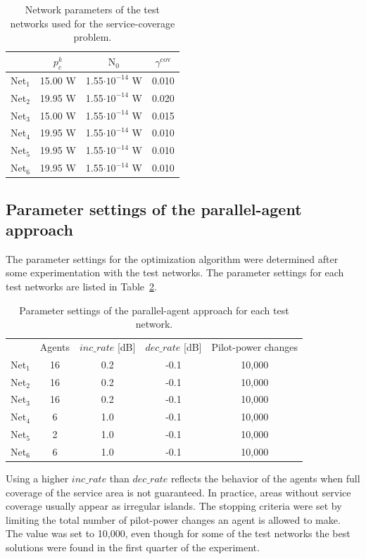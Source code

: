 \begin{table}
\caption{Network parameters of the test networks used for the service-coverage
problem.\emph{\label{tab:06-Test_network_parameters}}}


\centering

\begin{tabular}{cccc}
\cline{2-4} 
 & $p_{c}^{k}$ & $\mathrm{N}_{0}$ & $\gamma^{\mathrm{cov}}$\tabularnewline
\hline 
Net$_{1}$ & 15.00 W & 1.55$\cdot10^{-14}$ W & 0.010\tabularnewline
Net$_{2}$ & 19.95 W & 1.55$\cdot10^{-14}$ W & 0.020\tabularnewline
Net$_{3}$ & 15.00 W & 1.55$\cdot10^{-14}$ W & 0.015\tabularnewline
Net$_{4}$ & 19.95 W & 1.55$\cdot10^{-14}$ W & 0.010\tabularnewline
Net$_{5}$ & 19.95 W & 1.55$\cdot10^{-14}$ W & 0.010\tabularnewline
Net$_{6}$ & 19.95 W & 1.55$\cdot10^{-14}$ W & 0.010\tabularnewline
\hline 
\end{tabular}
\end{table}



\subsection{Parameter settings of the parallel-agent approach \label{sub:06-Algorithm_parameter_settings}}

The parameter settings for the optimization algorithm were determined
after some experimentation with the test networks. The parameter settings
for each test networks are listed in Table~\ref{tab:06-Parameter_settings}.

\begin{table}
\caption{Parameter settings of the parallel-agent approach for each test network.\emph{\label{tab:06-Parameter_settings}}}


\centering

\begin{tabular}{ccccc}
\cmidrule{2-5} 
 & Agents & $inc\_rate$ {[}dB{]} & $dec\_rate$ {[}dB{]} & Pilot-power changes\tabularnewline\addlinespace
\midrule
Net$_{1}$ & 16 & 0.2 & -0.1 & 10,000\tabularnewline
Net$_{2}$ & 16 & 0.2 & -0.1 & 10,000\tabularnewline
Net$_{3}$ & 16 & 0.2 & -0.1 & 10,000\tabularnewline
Net$_{4}$ & 6 & 1.0 & -0.1 & 10,000\tabularnewline
Net$_{5}$ & 2 & 1.0 & -0.1 & 10,000\tabularnewline
Net$_{6}$ & 6 & 1.0 & -0.1 & 10,000\tabularnewline
\bottomrule
\end{tabular}
\end{table}


Using a higher $inc\_rate$ than $dec\_rate$ reflects the behavior
of the agents when full coverage of the service area is not guaranteed.
In practice, areas without service coverage usually appear as irregular
islands. The stopping criteria were set by limiting the total number
of pilot-power changes an agent is allowed to make. The value was
set to 10,000, even though for some of the test networks the best
solutions were found in the first quarter of the experiment.


